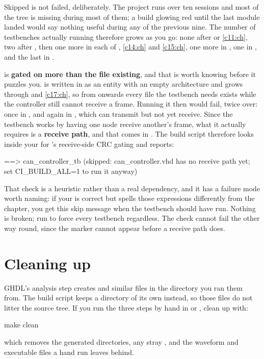 Skipped is not failed, deliberately. The project runs over ten sessions and most of the tree is
missing during most of them; a build glowing red until the last module landed would say nothing useful
during any of the previous nine. The number of testbenches actually running therefore grows as you go:
none after  or \ref{c11:ch}, two after , then one more in each of
, \ref{c14:ch} and \ref{c15:ch}, one more in , one in
, and the last in .

\begin{aside}
 is \textbf{gated on more than the file existing}, and that is worth knowing
before it puzzles you.  is written in  as an entity with an
empty architecture and grows through  and \ref{c17:ch}, so from 
onwards every file the testbench needs exists while the controller still cannot receive a frame.
Running it then would fail, twice over: once in , and again in , which
can transmit but not yet receive. Since the testbench works by having one node receive another's
frame, what it actually requires is a \textbf{receive path}, and that comes in . The
build script therefore looks inside your  for 's
receive-side CRC gating and reports:

\begin{console}
==> can_controller_tb (skipped: can_controller.vhd has no receive path yet;
    set CI_BUILD_ALL=1 to run it anyway)
\end{console}

That check is a heuristic rather than a real dependency, and it has a failure mode worth naming: if
your  is correct but spells those expressions differently from the chapter, you get
this skip message when the testbench should have run. Nothing is broken; run
 to force every testbench regardless. The check cannot fail the
other way round, since the marker cannot appear before a receive path does.
\end{aside}

\section{Cleaning up}
\label{app:sim:clean}

GHDL's analysis step creates  and similar files in the directory you ran them
from. The build script keeps a  directory of its own instead, so those files do not
litter the source tree. If you run the three steps by hand in  or ,
clean up with:

\begin{shell}
make clean
\end{shell}

which removes the generated  directories, any stray , and the waveform
and executable files a hand run leaves behind.
